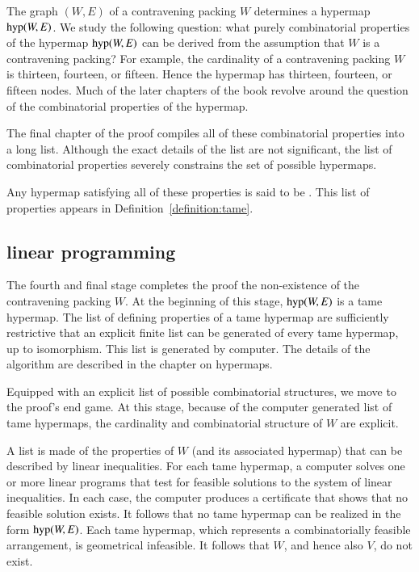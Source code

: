 The graph $(W,E)$ of a contravening packing $W$ determines a hypermap
${\operatorname{hyp}}(W,E)$. We study the following question: what  purely
combinatorial properties of the hypermap ${\operatorname{hyp}}(W,E)$ can be derived from
the assumption  that
$W$ is a contravening packing?  For example, the cardinality of a
contravening packing $W$ is thirteen, fourteen, or fifteen.  Hence the hypermap
has thirteen, fourteen, or fifteen nodes.  Much of the later chapters of the book
revolve around the question of the combinatorial properties of the
hypermap.

The final chapter of the proof compiles all of these combinatorial
properties into a long list.  
Although the exact details of the list are not significant,
the list of combinatorial properties severely constrains the set of possible
hypermaps.  

Any hypermap satisfying all of these properties is said to be
.  This list of properties appears in
Definition~\ref{definition:tame}.


\subsection{linear programming}

The fourth and final stage completes the proof the non-existence of
the contravening packing $W$.  At the beginning of this stage,
${\operatorname{hyp}}(W,E)$ is a tame hypermap.  The list of defining properties
of a tame hypermap are sufficiently restrictive that an explicit finite
list can be generated of every tame hypermap, up to isomorphism.  
This list is generated by computer.  The details of the algorithm are
described in the chapter on hypermaps.

Equipped with an explicit list of possible combinatorial structures,
we move to the proof's end game.  At this stage, because of the computer
generated list of tame hypermaps, the cardinality and
combinatorial structure of $W$ are explicit.

A list is made of the properties of $W$ (and its associated hypermap)
that can be described by linear inequalities.  For each tame hypermap,
a computer solves one or more linear programs that test for feasible
solutions to the system of linear inequalities.  In each case, the
computer produces a certificate that shows that no feasible solution
exists.  It follows that no tame hypermap can be realized in the form
${\operatorname{hyp}}(W,E)$.  Each tame hypermap, which represents a
combinatorially feasible arrangement, is geometrical infeasible.  It
follows that $W$, and hence also $V$, do not exist.

